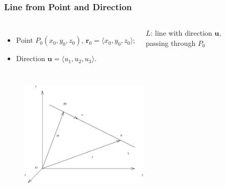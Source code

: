 \begin{frame}
\frametitle{Line from Point and Direction}
\begin{columns}
  \column{6cm}
\begin{itemize}
 \item Point $P_0(x_0,y_0,z_0)$, $\textbf{r}_0=\langle x_0,y_0,z_0\rangle$;
\item Direction $\textbf{u}=\langle u_1,u_2,u_3\rangle$.
\end{itemize}
  \column{5cm}
 $L$: line with direction $\textbf{u}$, \\passing through $P_0$
\end{columns}

\begin{columns}
  \column{6cm}

  \column{6.5cm}
    \begin{figure}
        \includegraphics[height=2in]{../../modules/vectors/pictures/ok-line_point_direction_scalar.eps}
    \end{figure}
\end{columns}
\end{frame}

